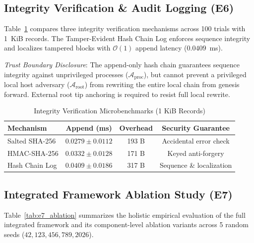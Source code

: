 \documentclass[journal]{IEEEtran}
\begin{document}
\subsection{Integrity Verification \& Audit Logging (E6)}
Table~\ref{tab:e6_integrity} compares three integrity verification mechanisms across 100 trials with 1~KiB records. The Tamper-Evident Hash Chain Log enforces sequence integrity and localizes tampered blocks with $\mathcal{O}(1)$ append latency ($0.0409$~ms).

\textit{Trust Boundary Disclosure}: The append-only hash chain guarantees sequence integrity against unprivileged processes ($\mathcal{A}_{\text{proc}}$), but cannot prevent a privileged local host adversary ($\mathcal{A}_{\text{root}}$) from rewriting the entire local chain from genesis forward. External root tip anchoring is required to resist full local rewrite.

\begin{table}[h]
\centering
\caption{Integrity Verification Microbenchmarks (1 KiB Records)}
\label{tab:e6_integrity}
\begin{tabular}{lccc}
\toprule
Mechanism & Append (ms) & Overhead & Security Guarantee \\
\midrule
Salted SHA-256 & $0.0279 \pm 0.0112$ & 193 B & Accidental error check \\
HMAC-SHA-256 & $0.0332 \pm 0.0128$ & 171 B & Keyed anti-forgery \\
Hash Chain Log & $0.0409 \pm 0.0186$ & 317 B & Sequence \& localization \\
\bottomrule
\end{tabular}
\end{table}

\subsection{Integrated Framework Ablation Study (E7)}
Table~\ref{tab:e7_ablation} summarizes the holistic empirical evaluation of the full integrated framework and its component-level ablation variants across 5 random seeds ($42, 123, 456, 789, 2026$).
\end{document}
